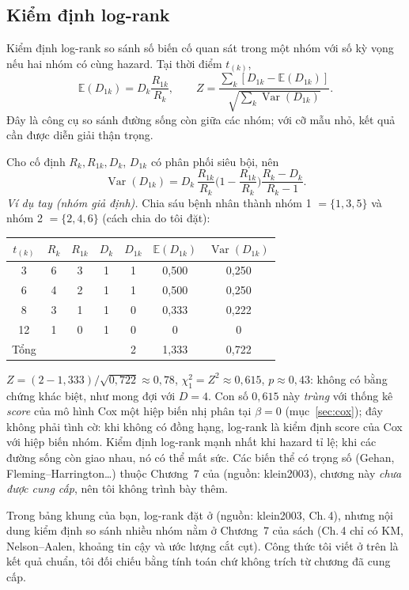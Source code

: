 \documentclass[11pt,a4paper,notitlepage]{report}
\newcommand{\E}{\mathbb{E}}
\newcommand{\Var}{\operatorname{Var}}
\providecommand{\nguon}[1]{(nguồn: #1)}
\begin{document}
\subsection{Kiểm định log-rank}

Kiểm định log-rank so sánh số biến cố quan sát trong một nhóm với số kỳ vọng nếu hai nhóm có
cùng hazard. Tại thời điểm $t_{(k)}$,
\[
\E(D_{1k})=D_k\frac{R_{1k}}{R_k},\qquad Z=\frac{\sum_k[D_{1k}-\E(D_{1k})]}{\sqrt{\sum_k\Var(D_{1k})}}.
\]
Đây là công cụ so sánh đường sống còn giữa các nhóm; với cỡ mẫu nhỏ, kết quả cần được diễn giải
thận trọng.

\begin{bosung}
Cho cố định $R_k,R_{1k},D_k$, $D_{1k}$ có phân phối siêu bội, nên
\[
\Var(D_{1k})=D_k\,\frac{R_{1k}}{R_k}\Big(1-\frac{R_{1k}}{R_k}\Big)\frac{R_k-D_k}{R_k-1}.
\]
\emph{Ví dụ tay (nhóm giả định).} Chia sáu bệnh nhân thành nhóm 1 $=\{1,3,5\}$ và nhóm 2 $=\{2,4,6\}$ (cách chia do tôi đặt):
\begin{center}\small
\begin{tabular}{ccccccc}
\toprule
$t_{(k)}$ & $R_k$ & $R_{1k}$ & $D_k$ & $D_{1k}$ & $\E(D_{1k})$ & $\Var(D_{1k})$\\
\midrule
3 & 6 & 3 & 1 & 1 & 0,500 & 0,250\\
6 & 4 & 2 & 1 & 1 & 0,500 & 0,250\\
8 & 3 & 1 & 1 & 0 & 0,333 & 0,222\\
12 & 1 & 0 & 1 & 0 & 0 & 0\\
\midrule
Tổng & & & & 2 & 1,333 & 0,722\\
\bottomrule
\end{tabular}
\end{center}
$Z=(2-1{,}333)/\sqrt{0{,}722}\approx0{,}78$, $\chi^2_1=Z^2\approx0{,}615$, $p\approx0{,}43$: không có bằng chứng khác biệt, như mong đợi với $D=4$.
Con số $0{,}615$ này \emph{trùng} với thống kê \emph{score} của mô hình Cox một hiệp biến nhị phân tại $\beta=0$ (mục~\ref{sec:cox}); đây không phải tình cờ: khi không có đồng hạng, log-rank là kiểm định score của Cox với hiệp biến nhóm.
Kiểm định log-rank mạnh nhất khi hazard tỉ lệ; khi các đường sống còn giao nhau, nó có thể mất sức. Các biến thể có trọng số (Gehan, Fleming--Harrington\ldots) thuộc Chương~7 của \nguon{klein2003}, chương này \emph{chưa được cung cấp}, nên tôi không trình bày thêm.
\end{bosung}

\begin{chinhsua}
Trong bảng khung của bạn, log-rank đặt ở \nguon{klein2003, Ch.\,4}, nhưng nội dung kiểm định so sánh nhiều nhóm nằm ở Chương~7 của sách (Ch.\,4 chỉ có KM, Nelson--Aalen, khoảng tin cậy và ước lượng cắt cụt). Công thức tôi viết ở trên là kết quả chuẩn, tôi đối chiếu bằng tính toán chứ không trích từ chương đã cung cấp.
\end{chinhsua}
\end{document}
